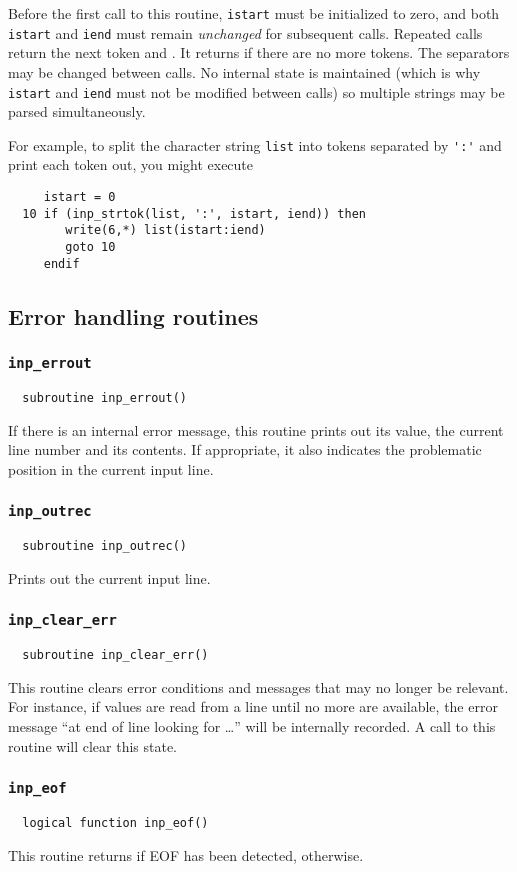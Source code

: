 Before the first call to this routine, \verb+istart+ must be initialized to zero,
and both
\verb+istart+ and \verb+iend+ must remain {\em unchanged} for subsequent calls.
Repeated calls return the next token and \TRUE.  It returns \FALSE if there are
no more tokens.  The separators may be changed between calls.  No
internal state is maintained (which is why \verb+istart+ and
\verb+iend+ must not be modified between calls) so multiple strings
may be parsed simultaneously.

For example, to split the character string \verb+list+ into tokens separated 
by \verb+':'+ and print each token out, you might execute
\begin{verbatim}
     istart = 0
  10 if (inp_strtok(list, ':', istart, iend)) then
        write(6,*) list(istart:iend)
        goto 10
     endif
\end{verbatim}

\subsection{Error handling routines}

\subsubsection{{\tt inp\_errout}}
\begin{verbatim}
  subroutine inp_errout()
\end{verbatim}
If there is an internal error message, this routine prints out its value, the
current line number and its contents.  If appropriate, it also indicates the
problematic position in the current input line.

\subsubsection{{\tt inp\_outrec}}
\begin{verbatim}
  subroutine inp_outrec()
\end{verbatim}
Prints out the current input line.

\subsubsection{{\tt inp\_clear\_err}}
\begin{verbatim}
  subroutine inp_clear_err()
\end{verbatim}
This routine clears error conditions and messages that may no longer be relevant.
For instance, if values are read from a line until no more are
available, the error message ``at end of line looking for \ldots''
will be internally recorded.  A call to this routine will clear this state.

\subsubsection{{\tt inp\_eof}}
\begin{verbatim}
  logical function inp_eof()
\end{verbatim}
This routine returns \TRUE if EOF has been detected, \FALSE otherwise.


